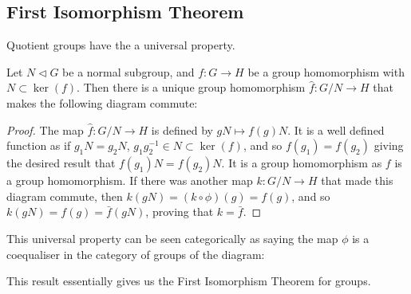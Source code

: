 \subsection{First Isomorphism Theorem}\label{sec:group-theory:first-isom-theorem}

Quotient groups have the a universal property.

\begin{theorem}\label{thm:group-theory:universal-property-of-quotient-groups}
  Let \(N \triangleleft G\) be a normal subgroup, and \(f : G \to H\) be a group homomorphism with \(N \subset \ker(f)\).
  Then there is a unique group homomorphism \(\hat f : G/N \to H\) that makes the following diagram commute:
  \begin{center}
  \end{center}
\end{theorem}

\begin{proof}
  The map \(\hat f: G/N \to H\) is defined by \(gN \mapsto f(g)N\).
  It is a well defined function as if \(g_{1}N = g_{2}N\), \(g_{1}g^{-1}_{2} \in N \subset \ker(f)\), and so \(f(g_{1})=f(g_{2})\) giving the desired result that \(f(g_{1})N = f(g_{2})N\).
  It is a group homomorphism as \(f\) is a group homomorphism.
  If there was another map \(k:G/N \to H\) that made this diagram commute, then \(k(gN) = (k \circ \phi)(g) = f(g)\), and so \(k(gN) = f(g) = \bar f (gN)\), proving that \(k = \bar f\).
\end{proof}

\begin{categorybox}
  This universal property can be seen categorically as saying the map \(\phi\) is a coequaliser in the category of groups of the diagram:

  \begin{centre}
  \end{centre}

\end{categorybox}

This result essentially gives us the First Isomorphism Theorem for groups.

